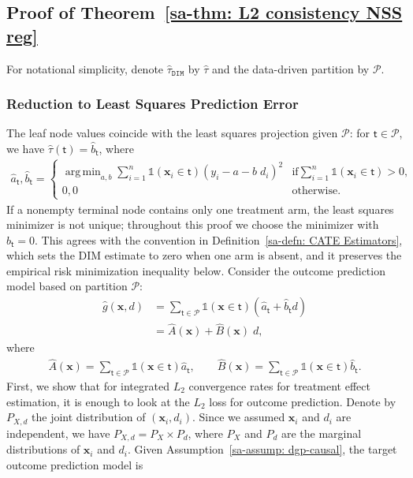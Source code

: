 \documentclass[10pt]{article}
\DeclareMathOperator*{\argmin}{arg\,min}
\def\nodet{\mathsf{t}}
\def\bx{\mathbf{x}}
\def\partitionP{\mathcal{P}}
\newcommand{\Indicator}{\mathds{1}}
\theoremstyle{definition}
\theoremstyle{remark}
\begin{document}
\subsection{Proof of Theorem~\ref{sa-thm: L2 consistency NSS reg}}

For notational simplicity, denote $\hat\tau_{\mathtt{DIM}}$ by $\hat{\tau}$ and the data-driven partition by $\partitionP$.

\subsubsection*{Reduction to Least Squares Prediction Error}

The leaf node values coincide with the least squares projection given $\partitionP$: for $\nodet \in \partitionP$, we have $\hat{\tau}(\nodet) = \hat{b}_{\nodet}$, where
\begin{align*}
    \hat{a}_{\nodet}, \hat{b}_{\nodet} = 
    \begin{cases}
        \argmin_{a, b} \sum_{i = 1}^n \Indicator(\bx_i \in \nodet) (y_i - a - b \; d_i)^2 & \text{if} \sum_{i = 1}^n \Indicator(\bx_i \in \nodet) > 0, \\
        0, 0 & \text{otherwise}.
    \end{cases}
\end{align*}
If a nonempty terminal node contains only one treatment arm, the least squares minimizer is not unique; throughout this proof we choose the minimizer with $\hat b_{\nodet}=0$. This agrees with the convention in Definition~\ref{sa-defn: CATE Estimators}, which sets the DIM estimate to zero when one arm is absent, and it preserves the empirical risk minimization inequality below.
Consider the outcome prediction model based on partition $\partitionP$:
\begin{align}\label{sa-eq: dim least square representation}
    \nonumber \hat{g}(\bx, d) & = \sum_{\nodet \in \partitionP} \Indicator(\bx \in \nodet) (\hat{a}_{\nodet} + \hat{b}_{\nodet} d) \\
    & = \hat{A}(\bx) + \hat{B}(\bx) \; d,
\end{align}
where
\begin{align*}
    \hat{A}(\bx) = \sum_{\nodet \in \partitionP} \Indicator(\bx \in \nodet) \hat{a}_{\nodet}, \qquad 
    \hat{B}(\bx) = \sum_{\nodet \in \partitionP} \Indicator(\bx \in \nodet) \hat{b}_{\nodet}.
\end{align*}
First, we show that for integrated $L_2$ convergence rates for treatment effect estimation, it is enough to look at the $L_2$ loss for outcome prediction. Denote by $P_{X,d}$ the joint distribution of $(\bx_i, d_i)$. Since we assumed $\bx_i$ and $d_i$ are independent, we have $P_{X,d} = P_X \times P_d$, where $P_X$ and $P_d$ are the marginal distributions of $\bx_i$ and $d_i$. Given Assumption~\ref{sa-assump: dgp-causal}, the target outcome prediction model is 
\end{document}
